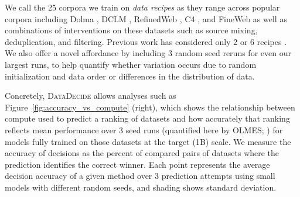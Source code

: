 \documentclass{article}
\theoremstyle{plain}
\theoremstyle{definition}
\theoremstyle{remark}
\newcommand{\numRecipes}{25}
\newcommand{\numScales}{14}
\newcommand{\numTargetSeeds}{3}
\newcommand{\projSuite}{\textsc{DataDecide}}
\newcommand{\olmes}{OLMES}
\newcommand{\twoClass}{decision accuracy}
\begin{document}
We call the \numRecipes{} corpora we train on \textit{data recipes} as they range across popular corpora including Dolma \citep{dolma}, DCLM \citep{li2024datacomplmsearchgenerationtraining}, RefinedWeb \citep{Penedo2023TheRD}, C4 \citep{2019t5}, and FineWeb \citep{penedo2024finewebdatasetsdecantingweb} as well as combinations of interventions on these datasets such as source mixing, deduplication, and filtering. Previous work has considered only 2 \citep{biderman2023pythiasuiteanalyzinglarge} or 6 recipes \citep{magnusson2024palomabenchmarkevaluatinglanguage, brandfonbrener2024losstolosspredictionscalinglaws}.
We also offer a novel affordance by including 3 random seed reruns for even our largest runs, to help quantify whether variation occurs due to random initialization and data order or differences in the distribution of data.

Concretely, \projSuite{} allows analyses such as Figure~\ref{fig:accuracy_vs_compute} (right), which shows the relationship between compute used to predict a ranking of datasets and how accurately that ranking reflects mean performance over \numTargetSeeds{} seed runs (quantified here by \olmes{}; \citealp{gu2024olmesstandardlanguagemodel}) for models fully trained on those datasets at the target (1B) scale. We measure the accuracy of decisions as the percent of compared pairs of datasets where the prediction identifies the correct winner. Each point represents the average \twoClass{} of a given method over 3 prediction attempts using small models with different random seeds, and shading shows standard deviation.

\begin{table}[h!]
    \centering
    \footnotesize
    \renewcommand{\arraystretch}{1.5}
    
    \caption{\projSuite{} enables the study of data differences over scales through controlled pretraining experiments on \numRecipes{} data recipes. These take different source datasets and apply interventions from ablating domains, deduplication, mixing, to quality filtering with different classifiers and thresholds.  We release all pretraining corpora, as well as models trained on each recipe and each of the \numScales{} model configurations in Table~ with \numTargetSeeds{} random seeds.}
    \label{tab:data_recipes}
\end{table}
\end{document}
